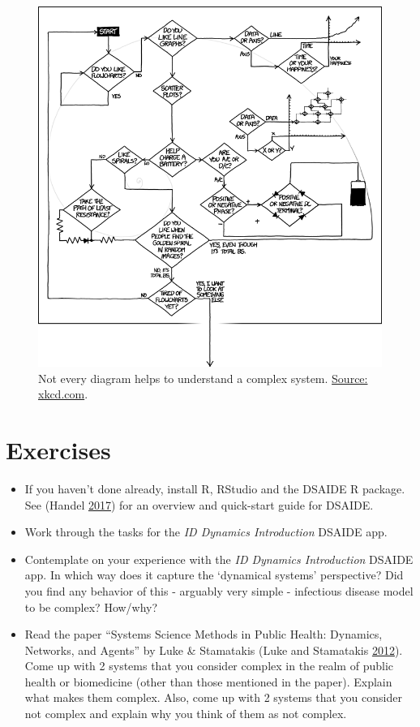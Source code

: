 \documentclass[]{book}
\providecommand{\tightlist}{%
  \setlength{\itemsep}{0pt}\setlength{\parskip}{0pt}}
\theoremstyle{definition}
\theoremstyle{definition}
\theoremstyle{definition}
\theoremstyle{remark}
\begin{document}
\begin{figure}
\centering
\includegraphics{./images/xkcd-flowcharts.png}
\caption{\label{fig:complexcartoon}Not every diagram helps to understand a
complex system. \href{https://xkcd.com/1488/}{Source: xkcd.com}.}
\end{figure}

\section{Exercises}\label{exercises}

\begin{itemize}
\tightlist
\item
  If you haven't done already, install R, RStudio and the DSAIDE R
  package. See (Handel \protect\hyperlink{ref-handel17}{2017}) for an
  overview and quick-start guide for DSAIDE.
\item
  Work through the tasks for the \emph{ID Dynamics Introduction} DSAIDE
  app.
\item
  Contemplate on your experience with the \emph{ID Dynamics
  Introduction} DSAIDE app. In which way does it capture the `dynamical
  systems' perspective? Did you find any behavior of this - arguably
  very simple - infectious disease model to be complex? How/why?
\item
  Read the paper ``Systems Science Methods in Public Health: Dynamics,
  Networks, and Agents'' by Luke \& Stamatakis (Luke and Stamatakis
  \protect\hyperlink{ref-luke12}{2012}). Come up with 2 systems that you
  consider complex in the realm of public health or biomedicine (other
  than those mentioned in the paper). Explain what makes them complex.
  Also, come up with 2 systems that you consider not complex and explain
  why you think of them as not complex.
\end{itemize}
\end{document}
